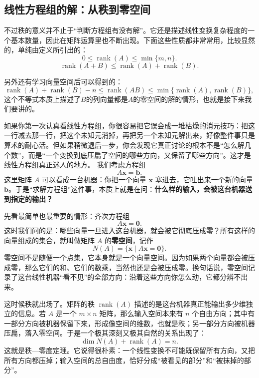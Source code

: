 \documentclass[UTF8]{ctexbook}
\begin{document}
\subsection{线性方程组的解：从秩到零空间}
不过秩的意义并不止于“判断方程组有没有解”。它还是描述线性变换复杂程度的一个基本数量，因此在矩阵运算里也不断出现。下面这些性质都非常常用，比较显然的，单纯由定义所引出的：
\[
0\le \operatorname{rank}(A)\le \min\{m,n\}.
\]
\[
\operatorname{rank}(A+B)\le \operatorname{rank}(A)+\operatorname{rank}(B).
\]

另外还有学习向量空间后可以得到的：
\[
\operatorname{rank}(A)+\operatorname{rank}(B)-n
\le \operatorname{rank}(AB)
\le \min\{\operatorname{rank}(A),\operatorname{rank}(B)\},
\]
这个不等式本质上描述了$B$的列向量都是$A$的零空间的解的情形，也就是接下来我们要讲的。

如果你第一次认真看线性方程组，你很容易把它误会成一堆枯燥的消元技巧：把这一行减去那一行，把这个未知元消掉，再把另一个未知元解出来，好像整件事只是算术的耐心活。但如果稍微退后一步，你会发现它真正讨论的根本不是“怎么解几个数”，而是“一个变换到底压扁了空间的哪些方向，又保留了哪些方向”。这才是线性方程组真正迷人的地方。
我们考虑方程组
\[
A\mathbf{x}=\mathbf{b}.
\]
这里矩阵 $A$ 可以看成一台机器：你把一个向量 $\mathbf{x}$ 塞进去，它吐出来一个新的向量 $\mathbf{b}$。于是“求解方程组”这件事，本质上就是在问：\textbf{什么样的输入，会被这台机器送到指定的输出？}

先看最简单也最重要的情形：齐次方程组
\[
A\mathbf{x}=\mathbf{0}.
\]
这时我们问的是：哪些向量一旦进入这台机器，就会被它彻底压成零？所有这样的向量组成的集合，就叫做矩阵 $A$ 的\textbf{零空间}\label{kernel}，记作
\[
N(A)=\{\mathbf{x}\mid A\mathbf{x}=\mathbf{0}\}.
\]
零空间不是随便一个点集，它本身就是一个向量空间。因为如果两个向量都会被压成零，那么它们的和、它们的数乘，当然也还是会被压成零。换句话说，零空间记录了这台线性机器“看不见”的全部方向：沿着这些方向你怎么动，它都分辨不出来。

这时候秩就出场了。矩阵的秩 $\operatorname{rank}(A)$ 描述的是这台机器真正能输出多少维独立的信息。若 $A$ 是一个 $m\times n$ 矩阵，那么输入空间本来有 $n$ 个自由方向；其中有一部分方向被机器保留下来，形成像空间的维数，也就是秩；另一部分方向被机器压扁，落入零空间。于是一个极其深刻又极其自然的关系出现了：
\[
\dim N(A)+\operatorname{rank}(A)=n.
\]
这就是秩—零度定理。它说得很朴素：一个线性变换不可能既保留所有方向，又把所有方向都压掉；输入空间的总自由度，恰好分成“被看见的部分”和“被抹掉的部分”。
\end{document}
